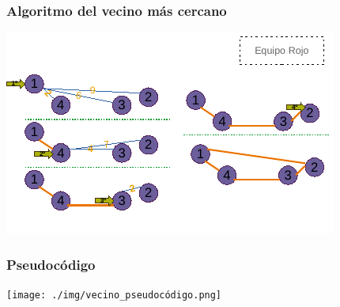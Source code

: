 \documentclass[13pt]{beamer}
\begin{document}
    \begin{frame}
		\frametitle{Algoritmo del vecino más cercano}
		\begin{center}
			\includegraphics[scale=1.5]{./img/DibVecCercano.pdf}
		\end{center}
	\end{frame}

	\begin{frame}
		\frametitle{Pseudocódigo}
		\begin{center}
			\texttt{[image: ./img/vecino\_pseudocódigo.png]}
		\end{center}
	\end{frame}
\end{document}

